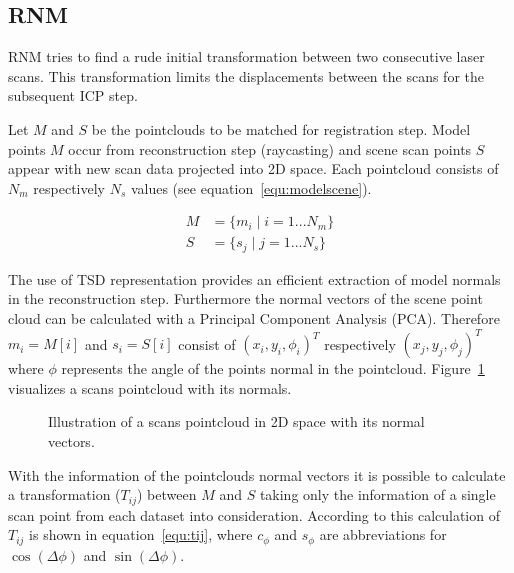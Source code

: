 \documentclass[conference]{IEEEtran}
\begin{document}
\subsection{RNM}
RNM tries to find a rude initial transformation between two consecutive laser scans. This transformation limits the displacements between the scans for the subsequent ICP step.

Let $M$ and $S$ be the pointclouds to be matched for registration step. Model points $M$ occur from reconstruction step (raycasting) and scene scan points $S$ appear with new scan data projected into 2D space. Each pointcloud consists of $N_m$ respectively $N_s$ values (see equation~\ref{equ:modelscene}).

\begin{align}
\label{equ:modelscene}
M &= \{m_i \mid i = 1...N_m\} \\
S &= \{s_j \mid j = 1...N_s\} \nonumber
\end{align}

The use of TSD representation provides an efficient extraction of model normals in the reconstruction step.  Furthermore the normal vectors of the scene point cloud can be calculated with a Principal Component Analysis (PCA).  Therefore $m_i=M[i]$ and $s_i=S[i]$ consist of $(x_i, y_i, \phi_i)^T$ respectively $(x_j, y_j, \phi_j)^T$ where $\phi$ represents the angle of the points normal in the pointcloud. Figure~\ref{fig:pointcloud} visualizes a scans pointcloud with its normals.

\begin{figure}[htb] 
	\centering 
	\def\svgwidth{200pt} 
	 
	\caption{Illustration of a scans pointcloud in 2D space with its normal vectors.} 
	\label{fig:pointcloud}
\end{figure}

With the information of the pointclouds normal vectors it is possible to calculate a transformation ($T_{ij}$) between $M$ and $S$ taking only the information of a single scan point from each dataset into consideration. According to this calculation of $T_{ij}$ is shown in equation~\ref{equ:tij}, where $c_{\phi}$ and $s_\phi$ are abbreviations for $\cos(\Delta\phi)$ and $\sin(\Delta\phi)$.
\end{document}
